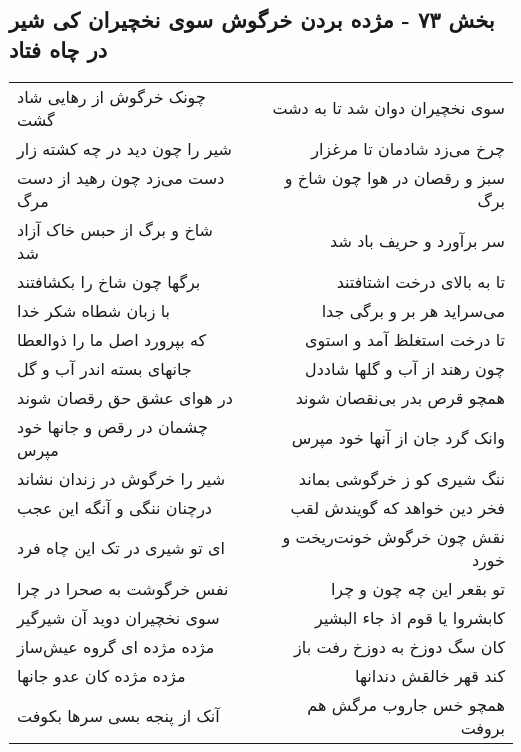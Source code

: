 \begin{center}
\section*{بخش ۷۳ - مژده بردن خرگوش سوی نخچیران کی شیر در چاه فتاد}
\label{sec:sh073}
\begin{longtable}{l p{0.5cm} r}
چونک خرگوش از رهایی شاد گشت
&&
سوی نخچیران دوان شد تا به دشت
\\
شیر را چون دید در چه کشته زار
&&
چرخ می‌زد شادمان تا مرغزار
\\
دست می‌زد چون رهید از دست مرگ
&&
سبز و رقصان در هوا چون شاخ و برگ
\\
شاخ و برگ از حبس خاک آزاد شد
&&
سر برآورد و حریف باد شد
\\
برگها چون شاخ را بکشافتند
&&
تا به بالای درخت اشتافتند
\\
با زبان شطاه شکر خدا
&&
می‌سراید هر بر و برگی جدا
\\
که بپرورد اصل ما را ذوالعطا
&&
تا درخت استغلظ آمد و استوی
\\
جانهای بسته اندر آب و گل
&&
چون رهند از آب و گلها شاددل
\\
در هوای عشق حق رقصان شوند
&&
همچو قرص بدر بی‌نقصان شوند
\\
چشمان در رقص و جانها خود مپرس
&&
وانک گرد جان از آنها خود مپرس
\\
شیر را خرگوش در زندان نشاند
&&
ننگ شیری کو ز خرگوشی بماند
\\
درچنان ننگی و آنگه این عجب
&&
فخر دین خواهد که گویندش لقب
\\
ای تو شیری در تک این چاه فرد
&&
نقش چون خرگوش خونت‌ریخت و خورد
\\
نفس خرگوشت به صحرا در چرا
&&
تو بقعر این چه چون و چرا
\\
سوی نخچیران دوید آن شیرگیر
&&
کابشروا یا قوم اذ جاء البشیر
\\
مژده مژده ای گروه عیش‌ساز
&&
کان سگ دوزخ به دوزخ رفت باز
\\
مژده مژده کان عدو جانها
&&
کند قهر خالقش دندانها
\\
آنک از پنجه بسی سرها بکوفت
&&
همچو خس جاروب مرگش هم بروفت
\\
\end{longtable}
\end{center}
